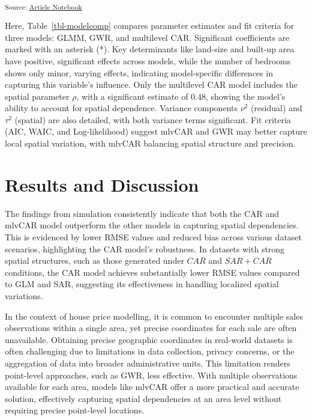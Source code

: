 \documentclass[
  default,
]{sn-jnl}
\begin{document}
\textsubscript{Source:
\href{https://indiraputeri-phd.github.io/CAR_simcomp/manuscript.qmd.html}{Article
Notebook}}

Here, Table~\ref{tbl-modelcomp} compares parameter estimates and fit
criteria for three models: GLMM, GWR, and multilevel CAR. Significant
coefficients are marked with an asterisk (*). Key determinants like
land-size and built-up area have positive, significant effects across
models, while the number of bedrooms shows only minor, varying effects,
indicating model-specific differences in capturing this variable's
influence. Only the multilevel CAR model includes the spatial parameter
\(\rho\), with a significant estimate of 0.48, showing the model's
ability to account for spatial dependence. Variance components \(\nu^2\)
(residual) and \(\tau^2\) (spatial) are also detailed, with both
variance terms significant. Fit criteria (AIC, WAIC, and Log-likelihood)
suggest mlvCAR and GWR may better capture local spatial variation, with
mlvCAR balancing spatial structure and precision.

\section{Results and Discussion}\label{results-and-discussion}

The findings from simulation consistently indicate that both the CAR and
mlvCAR model outperform the other models in capturing spatial
dependencies. This is evidenced by lower RMSE values and reduced bias
across various dataset scenarios, highlighting the CAR model's
robustness. In datasets with strong spatial structures, such as those
generated under \(CAR\) and \(SAR + CAR\) conditions, the CAR model
achieves substantially lower RMSE values compared to GLM and SAR,
suggesting its effectiveness in handling localized spatial variations.

In the context of house price modelling, it is common to encounter
multiple sales observations within a single area, yet precise
coordinates for each sale are often unavailable. Obtaining precise
geographic coordinates in real-world datasets is often challenging due
to limitations in data collection, privacy concerns, or the aggregation
of data into broader administrative units. This limitation renders
point-level approaches, such as GWR, less effective. With multiple
observations available for each area, models like mlvCAR offer a more
practical and accurate solution, effectively capturing spatial
dependencies at an area level without requiring precise point-level
locations.
\end{document}

